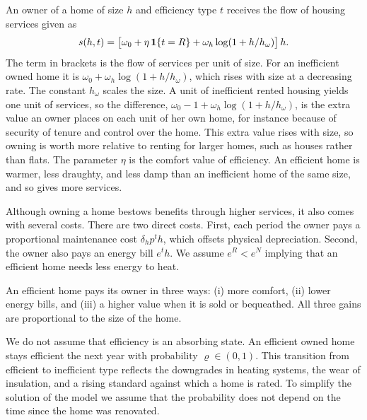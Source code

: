 An owner of a home of size $h$ and efficiency type $t$ receives the flow of
housing services given as
\begin{equation}
  s(h,t)=\bigl[\omega_0+\eta\,\mathbf 1\{t=R\}+\omega_h\log(1+h/h_\omega)\bigr]\,h.
  \label{eq:owner-services}
\end{equation}
The term in brackets is the flow of services per unit of size. For an
inefficient owned home it is $\omega_0+\omega_h\log(1+h/h_\omega)$, which
rises with size at a decreasing rate. The constant $h_\omega$ scales the size. A unit of inefficient rented housing yields one unit of services, so the difference,
$\omega_0-1+\omega_h\log(1+h/h_\omega)$, is the extra value an owner places
on each unit of her own home, for instance because of security of tenure
and control over the home. This extra value rises with size, so owning is
worth more relative to renting for larger homes, such as houses rather
than flats. The
parameter $\eta$ is the comfort value of efficiency. An efficient home is
warmer, less draughty, and less damp than an inefficient home of the same
size, and so gives more services.

Although owning a home bestows benefits through higher services, it also comes with several costs. There are two direct costs. First,  each period the owner pays a proportional maintenance cost $\delta_hp^th$, which offsets physical depreciation. Second, the owner also pays an energy bill $e^th$. We assume $e^R<e^N$ implying that an efficient home needs less energy to heat.

An efficient home pays its owner in three ways: (i) more comfort, (ii) lower
energy bills, and (iii) a higher value when it is sold or bequeathed. All three
gains are proportional to the size of the home.


We do not assume that efficiency is an absorbing state. An efficient owned home stays efficient the next year with probability $\varrho \in (0,1)$. This transition from efficient to inefficient type reflects the downgrades in heating systems, the wear of insulation, and a rising standard against which a home is rated.  To simplify the solution of the model we assume that the probability does not depend on the time since the home was renovated.


